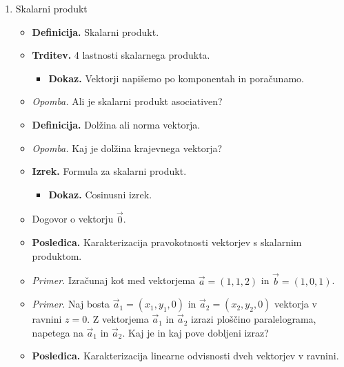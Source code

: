 \begin{enumerate}
    \item Skalarni produkt
    \begin{itemize}
        \item \colorbox{purple!30}{\textbf{Definicija.}} Skalarni produkt.
        \item \colorbox{blue!30}{\textbf{Trditev.}} 4 lastnosti skalarnega produkta.
        \begin{itemize}
            \item \colorbox{green!30}{\textbf{Dokaz.}} Vektorji napišemo po komponentah in poračunamo.
        \end{itemize}
        \item \colorbox{yellow!30}{\emph{Opomba.}} Ali je skalarni produkt asociativen?
        \item \colorbox{purple!30}{\textbf{Definicija.}} Dolžina ali norma vektorja.
        \item \colorbox{yellow!30}{\emph{Opomba.}} Kaj je dolžina krajevnega vektorja?
        \item \colorbox{blue!30}{\textbf{Izrek.}} Formula za skalarni produkt.
        \begin{itemize}
            \item \colorbox{green!30}{\textbf{Dokaz.}} Cosinusni izrek.
        \end{itemize}
        \item Dogovor o vektorju $\vec{0}$.
        \item \colorbox{orange!30}{\textbf{Posledica.}} Karakterizacija pravokotnosti vektorjev s skalarnim produktom.
        \item \colorbox{yellow!30}{\emph{Primer.}} Izračunaj kot med vektorjema $\vec{a}=(1,1,2)$ in $\vec{b} = (1, 0, 1)$.
        \item \colorbox{yellow!30}{\emph{Primer.}} Naj bosta $\vec{a}_1=(x_1,y_1,0)$ in $\vec{a}_2=(x_2,y_2,0)$ vektorja v ravnini $z=0$. Z vektorjema $\vec{a}_1$ in $\vec{a}_2$ izrazi ploščino paralelograma, napetega na $\vec{a}_1$ in $\vec{a}_2$. Kaj je in kaj pove dobljeni izraz?
        \item \colorbox{orange!30}{\textbf{Posledica.}} Karakterizacija linearne odvisnosti dveh vektorjev v ravnini.
    \end{itemize}


\end{enumerate}
